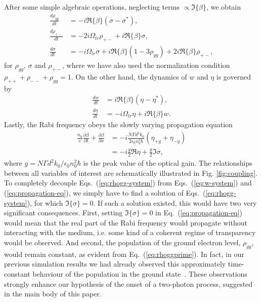\documentclass[onecolumn,secnumarabic,amssymb, nobibnotes, aip, prd]{revtex4-1}
\def\p{\partial}
\begin{document}
After some simple algebraic operations, neglecting terms $\propto \Im \{\beta\}$, we obtain
\begin{subequations}
	\label{eq:rhogg-system}
	\begin{align}
	\frac{d \rho_{gg}}{dt} &= - i\Re\{\beta\}(\sigma-\sigma^*), \label{eq:rhoggprime} \\
	\frac{d \rho_{+-}}{dt} &= -2i\Omega_{lr}\rho_{+-}+i\Re\{\beta\}\sigma,\\
	\frac{d \sigma}{dt} &= -i\Omega_{lr}\sigma+i\Re\{\beta\}(1-3\rho_{gg})+2i\Re\{\beta\}\rho_{+-},
	\end{align}
\end{subequations}
for $\rho_{gg}$, $\sigma$ and $\rho_{+-}$, where we have also used the normalization condition ${\rho_{++}+\rho_{--}+\rho_{gg} = 1}$. On the other hand, the dynamics of $w$ and $\eta$ is governed by 
\begin{subequations}
\label{eq:w-system}
\begin{align}
\frac{d w}{dt} &= i\Re\{\beta\}(\eta-\eta^*), \\
\frac{d \eta}{dt} &= -i\Omega_{lr}\eta+i\Re\{\beta\} w. \label{eq:eta}
\end{align}
\end{subequations}
Lastly, the Rabi frequency obeys the slowly varying propagation equation \cite{jirauschek2014modeling}
\begin{align}
\label{eq:propagation-eq}
\frac{n_0}{c}\frac{\p \beta}{\p t} + \frac{\p \beta}{\p x} &= - i\frac{N\Gamma d^2 k_0}{2\epsilon_0n_0^2\hbar}(\eta_{+g}+\eta_{-g}) \nonumber \\
		&=  -i\frac{g}{2}\Re{\eta}+\frac{g}{2}\Im{\sigma},
\end{align}
where $g =N\Gamma d^2 k_0/\epsilon_0n_0^2\hbar $ is the peak value of the optical gain. The relationships between all variables of interest are schematically illustrated in Fig. \ref{fig:coupling}. 
To completely decouple Eqs.~(\ref{eq:rhogg-system}) from Eqs.~(\ref{eq:w-system}) and (\ref{eq:propagation-eq}), we simply have to find a solution of Eqs.~(\ref{eq:rhogg-system}), for which $\Im\{\sigma\} =0$. If such a solution existed, this would have two very significant consequences. First, setting $\Im\{\sigma\} =0$ in Eq.~(\ref{eq:propagation-eq}) would mean that the real part of the Rabi frequency would propagate without interacting with the medium, i.e. some kind of a coherent regime of transparency would be observed. And second, the population of the ground electron level, $\rho_{gg}$, would remain constant, as evident from Eq.~(\ref{eq:rhoggprime}). In fact, in our previous simulation results we had already observed this approximately time-constant behaviour of the population in the ground state~\cite{tzenov2017temporal}. These observations strongly enhance our hypothesis of the onset of a two-photon process, suggested in the main body of this paper.
\end{document}
